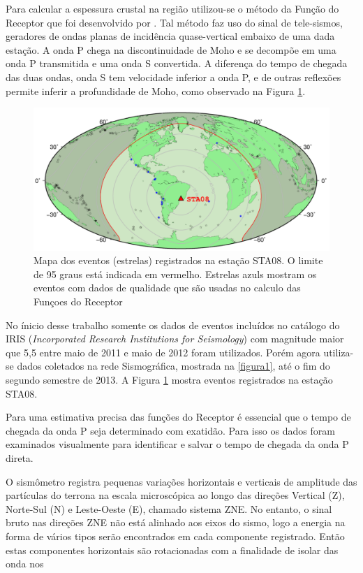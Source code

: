 Para calcular a espessura crustal na região utilizou-se o método da Função do Receptor que foi desenvolvido por \cite{Langston_1977}. Tal método faz uso do sinal de tele-sismos, geradores de ondas planas de incidência quase-vertical embaixo de uma dada estação. A onda P chega na discontinuidade de Moho e se decompõe em uma onda P transmitida e uma onda S convertida. A diferença do tempo de chegada das duas ondas, onda S tem velocidade inferior a onda P, e de outras reflexões permite inferir a profundidade de Moho, como observado na Figura \ref{figura5}.

\begin{figure}[!ht]
\centering
\includegraphics[scale=0.6]{mapa_de_eventos.png}
\caption{Mapa dos eventos (estrelas) registrados na estação STA08. O limite de 95 graus está indicada em vermelho. Estrelas azuls mostram os eventos com dados de qualidade que são usadas no calculo das Funçoes do Receptor}
\label{figura5}
\end{figure}

No ínicio desse trabalho somente os dados de eventos incluídos no catálogo do IRIS (\textit{Incorporated Research Institutions for Seismology}) com magnitude maior que 5,5 entre maio de 2011 e maio de 2012 foram utilizados. Porém agora utiliza-se dados coletados na rede Sismográfica, mostrada na \ref{figura1}, até o fim do segundo semestre de 2013. A Figura \ref{figura5} mostra eventos registrados na estação STA08.

Para uma estimativa precisa das funções do Receptor é essencial que o tempo de chegada da onda P seja determinado com exatidão. Para isso os dados foram examinados visualmente para identificar e salvar o tempo de chegada da onda P direta. 

O sismômetro registra pequenas variações horizontais e verticais de amplitude das partículas do terrona na escala microscópica ao longo das direções Vertical (Z), Norte-Sul (N) e Leste-Oeste (E), chamado sistema ZNE. No entanto, o sinal bruto nas direções ZNE não está alinhado aos eixos do sismo, logo a energia na forma de vários tipos serão encontrados em cada componente registrado. Então estas componentes horizontais são rotacionadas com a finalidade de isolar das onda nos 



